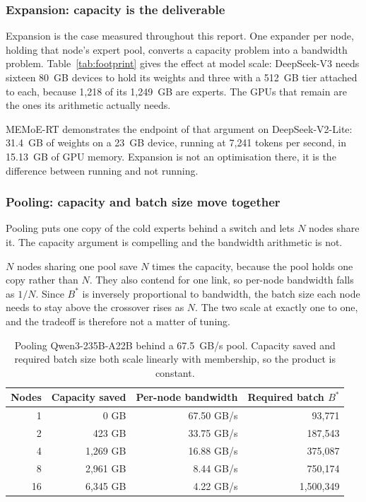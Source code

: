 \documentclass[10pt,a4paper]{article}
\begin{document}
\subsubsection*{Expansion: capacity is the deliverable}

Expansion is the case measured throughout this report. One expander per node,
holding that node's expert pool, converts a capacity problem into a bandwidth
problem. Table~\ref{tab:footprint} gives the effect at model scale: DeepSeek-V3
needs sixteen 80~GB devices to hold its weights and three with a 512~GB tier
attached to each, because 1{,}218 of its 1{,}249~GB are experts. The GPUs that
remain are the ones its arithmetic actually needs.

MEMoE-RT demonstrates the endpoint of that argument on DeepSeek-V2-Lite: 31.4~GB
of weights on a 23~GB device, running at 7{,}241 tokens per second, in 15.13~GB
of GPU memory. Expansion is not an optimisation there, it is the difference
between running and not running.

\subsubsection*{Pooling: capacity and batch size move together}

Pooling puts one copy of the cold experts behind a switch and lets $N$ nodes
share it. The capacity argument is compelling and the bandwidth arithmetic is
not.

$N$ nodes sharing one pool save $N$ times the capacity, because the pool holds
one copy rather than $N$. They also contend for one link, so per-node bandwidth
falls as $1/N$. Since $B^{*}$ is inversely proportional to bandwidth, the batch
size each node needs to stay above the crossover rises as $N$. The two scale at
exactly one to one, and the tradeoff is therefore not a matter of tuning.

\begin{table}[htbp]
\centering\small
\caption{Pooling Qwen3-235B-A22B behind a 67.5~GB/s pool. Capacity saved and
required batch size both scale linearly with membership, so the product is
constant.}
\label{tab:pooling}
\begin{tabular}{rrrr}
\toprule
Nodes & Capacity saved & Per-node bandwidth & Required batch $B^{*}$ \\
\midrule
1  &        0 GB & 67.50 GB/s &    93{,}771 \\
2  &      423 GB & 33.75 GB/s &   187{,}543 \\
4  & 1{,}269 GB & 16.88 GB/s &   375{,}087 \\
8  & 2{,}961 GB &  8.44 GB/s &   750{,}174 \\
16 & 6{,}345 GB &  4.22 GB/s & 1{,}500{,}349 \\
\bottomrule
\end{tabular}
\end{table}
\end{document}
